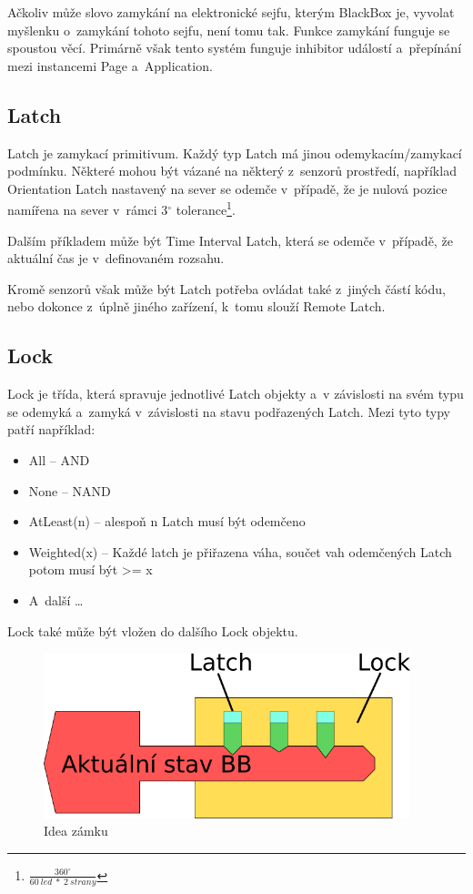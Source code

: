Ačkoliv může slovo zamykání na elektronické sejfu, kterým BlackBox je, vyvolat myšlenku o~zamykání tohoto sejfu, není tomu tak.
Funkce zamykání funguje se spoustou věcí.
Primárně však tento systém funguje inhibitor událostí a~přepínání mezi instancemi Page a~Application.

\subsection{Latch}
Latch je zamykací primitivum.
Každý typ Latch má jinou odemykacím/zamykací podmínku.
Některé mohou být vázané na některý z~senzorů prostředí, například Orientation Latch nastavený na sever se odemče v~případě, že je nulová pozice namířena na sever v~rámci 3$^{\circ}$ tolerance\footnote{$\frac{360^{\circ}}{60~led~*~2~strany}$}.

Dalším příkladem může být Time Interval Latch, která se odemče v~případě, že aktuální čas je v~definovaném rozsahu.

Kromě senzorů však může být Latch potřeba ovládat také z~jiných částí kódu, nebo dokonce z~úplně jiného zařízení, k~tomu slouží Remote Latch.

\subsection{Lock}

Lock je třída, která spravuje jednotlivé Latch objekty a~v závislosti na svém typu se odemyká a~zamyká v~závislosti na stavu podřazených Latch.
Mezi tyto typy patří například:
\begin{itemize}
    \item All -- AND
    \item None -- NAND
    \item AtLeast(n) -- alespoň n Latch musí být odemčeno
    \item Weighted(x) -- Každé latch je přiřazena váha, součet vah odemčených Latch potom musí být >= x
    \item A~další \dots
\end{itemize}
Lock také může být vložen do dalšího Lock objektu.

\begin{figure}[H]
    \begin{small}
        \begin{center}
            \includegraphics[width=0.95\textwidth]{img/lock.png}
        \end{center}
        \caption{Idea zámku}
        \label{fig:lock}
    \end{small}
\end{figure}

